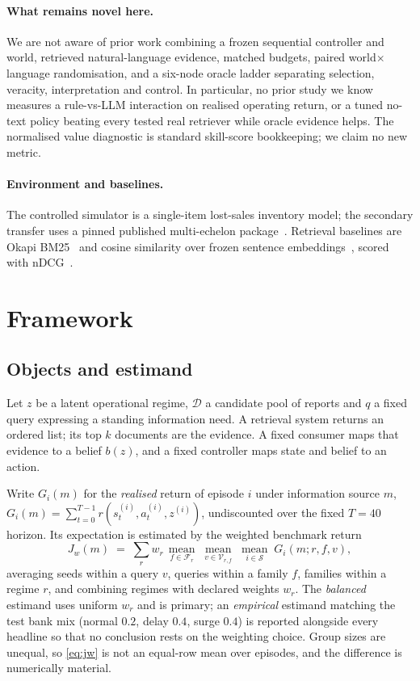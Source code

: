 \documentclass[runningheads]{llncs}
\begin{document}
\paragraph{What remains novel here.}
We are not aware of prior work combining a frozen sequential controller and
world, retrieved natural-language evidence, matched budgets, paired
world$\times$language randomisation, and a six-node oracle ladder separating
selection, veracity, interpretation and control. In particular, no prior study
we know measures a rule-vs-LLM interaction on realised operating return, or a
tuned no-text policy beating every tested real retriever while oracle evidence
helps. The normalised value diagnostic is standard skill-score bookkeeping;
we claim no new metric.

\paragraph{Environment and baselines.}
The controlled simulator is a single-item lost-sales inventory model; the
secondary transfer uses a pinned published multi-echelon
package~\cite{gyminvmgmt}. Retrieval baselines are Okapi
BM25~\cite{robertson1994okapi} and cosine similarity over frozen
sentence embeddings~\cite{reimers2019sentencebert}, scored with
nDCG~\cite{jarvelin2002cumulated}.

\section{Framework}
\label{sec:framework}

\subsection{Objects and estimand}

Let $z$ be a latent operational regime, $\mathcal{D}$ a candidate pool of
reports and $q$ a fixed query expressing a standing information need. A
retrieval system returns an ordered list; its top $k$ documents are the
evidence. A fixed consumer maps that evidence to a belief $b(z)$, and a fixed
controller maps state and belief to an action.

Write $G_i(m)$ for the \emph{realised} return of episode $i$ under information
source $m$, $G_i(m)=\sum_{t=0}^{T-1} r(s^{(i)}_t,a^{(i)}_t,z^{(i)})$,
undiscounted over the fixed $T=40$ horizon. Its expectation is estimated by
the weighted benchmark return
\begin{equation}
\label{eq:jw}
J_w(m) \;=\; \sum_{r} w_r \,
\operatorname*{mean}_{f \in \mathcal{F}_r} \;
\operatorname*{mean}_{v \in \mathcal{V}_{r,f}} \;
\operatorname*{mean}_{i \in \mathcal{S}} \; G_i(m; r, f, v),
\end{equation}
averaging seeds within a query $v$, queries within a family $f$, families
within a regime $r$, and combining regimes with declared weights $w_r$. The
\emph{balanced} estimand uses uniform $w_r$ and is primary; an
\emph{empirical} estimand matching the test bank mix (normal $0.2$, delay
$0.4$, surge $0.4$) is reported alongside every headline so that no
conclusion rests on the weighting choice. Group sizes are unequal, so
\eqref{eq:jw} is not an equal-row mean over episodes, and the difference is
numerically material.
\end{document}
